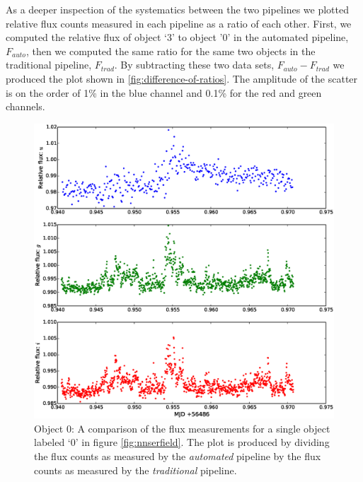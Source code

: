 As a deeper inspection of the systematics between the two pipelines we plotted relative flux counts measured in each pipeline as a ratio of each other. First, we computed the relative flux of object `3' to object '0' in the automated pipeline, $F_{auto}$, then we computed the same ratio for the same two objects in the traditional pipeline, $F_{trad}$. By subtracting these two data sets,  $F_{auto} - F_{trad}$ we produced the plot shown in \ref{fig:difference-of-ratios}. The amplitude of the scatter is on the order of 1\% in the blue channel and 0.1\% for the red and green channels. 

\begin{figure}
\centering
\includegraphics[width=140mm]{images/compare_photometry.eps}
\caption{Object 0: A comparison of the flux measurements for a single object labeled `0' in figure \ref{fig:nnserfield}. The plot is produced by dividing the flux counts as measured by the \emph{automated} pipeline by the flux counts as measured by the \emph{traditional} pipeline.}
\label{fig:comparephotometry}
\end{figure}

